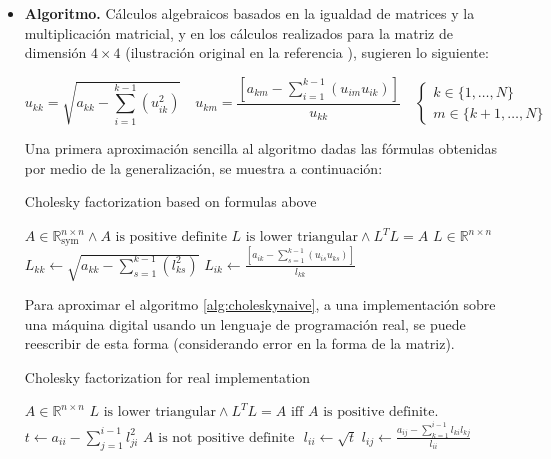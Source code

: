 \documentclass[11pt, spanish]{article}
\begin{document}
\begin{itemize}
\item \textbf{Algoritmo.} Cálculos algebraicos basados en la igualdad de matrices y la multiplicación matricial, y en los cálculos realizados para la matriz de dimensión $4 \times 4$ (ilustración original en la referencia \cite{yang2005applied}), sugieren lo siguiente:

$$u_{kk} = \sqrt{a_{kk} - \sum_{i = 1}^{k - 1}(u_{ik}^2)} \quad u_{km} = \frac{\left[ a_{km} - \sum_{i = 1}^{k-1} \left( u_{im}u_{ik}\right)\right]}{u_{kk}} \quad \begin{cases} 
      k \in \{1,\dots, N\} \\
      m \in \{k+1,\dots, N\} 
   \end{cases}$$
   
Una primera aproximación sencilla al algoritmo dadas las fórmulas obtenidas por medio de la generalización, se muestra a continuación:

\begin{algorithm}[h]
\caption{Cholesky factorization based on formulas above}
\label{alg:choleskynaive}
\begin{algorithmic}[1]
\Require $A \in \mathbb{R}_{\text{sym}}^{n \times n} \wedge A \text{ is positive definite}$
\Ensure $L \text{ is lower triangular} \wedge L^TL = A$
\State $L \in \mathbb{R}^{n \times n}$
\State $L_{kk} \gets \sqrt{a_{kk} - \sum_{s = 1}^{k - 1}(l_{ks}^2)}$
\State $L_{ik} \gets  \frac{\left[ a_{ik} - \sum_{s = 1}^{k-1} \left( u_{is}u_{ks}\right)\right]}{l_{kk}}$
\EndFor
\EndFor
{}
\EndProcedure
\end{algorithmic}
\end{algorithm}

Para aproximar el algoritmo \ref{alg:choleskynaive}, a una implementación sobre una máquina digital usando un lenguaje de programación real, se puede reescribir de esta forma (considerando error en la forma de la matriz).

\begin{algorithm}[h]
\caption{Cholesky factorization for real implementation}
\label{alg:choleskyreal}
\begin{algorithmic}[1]
\Require $A \in \mathbb{R}^{n \times n}$
\Ensure $L \text{ is lower triangular} \wedge L^TL = A \text{ iff } A \text{ is positive definite.}$
\State $t \gets a_{ii} - \sum_{j = 1}^{i - 1}l_{ji}^2$
\State $A \text{ is not positive definite }$
\EndIf
\State $l_{ii} \gets \sqrt{t}$
\State $l_{ij} \gets \frac{a_{ij} - \sum_{k=1}^{i-1}l_{ki}l_{kj}}{l_{ii}}$
\EndFor
\EndFor
{}
\EndProcedure
\end{algorithmic}
\end{algorithm}


\end{itemize}
\end{document}

